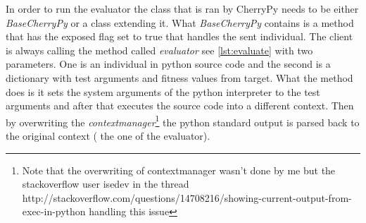 In order to run the evaluator the class that is ran by CherryPy needs to be either \textit{BaseCherryPy} or a class extending it. What \textit{BaseCherryPy} contains
is a method that has the exposed flag set to true that handles the sent individual. The client is always calling the method called \textit{evaluator} see \ref{lst:evaluate} with two parameters.
One is an individual in python source code and the second is a dictionary with test arguments and fitness values from target. What the method does is it sets the system arguments
of the python interpreter to the test arguments and after that executes the source code into a different context. Then by overwriting the \textit{contextmanager}\footnote{Note that the overwriting of contextmanager
wasn't done by me but the stackoverflow user isedev in the thread http://stackoverflow.com/questions/14708216/showing-current-output-from-exec-in-python handling this issue} the python standard output is
parsed back to the original context ( the one of the evaluator).